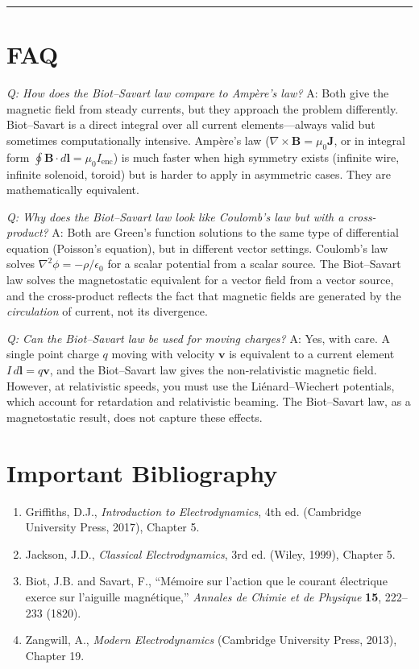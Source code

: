 \bigskip
\hrule
\bigskip
\section*{FAQ}

\textit{Q: How does the Biot--Savart law compare to Ampère's law?}
A: Both give the magnetic field from steady currents, but they approach the problem differently. Biot--Savart is a direct integral over all current elements---always valid but sometimes computationally intensive. Ampère's law ($\nabla\times\mathbf{B} = \mu_0\mathbf{J}$, or in integral form $\oint\mathbf{B}\cdot d\mathbf{l} = \mu_0 I_{\text{enc}}$) is much faster when high symmetry exists (infinite wire, infinite solenoid, toroid) but is harder to apply in asymmetric cases. They are mathematically equivalent.

\textit{Q: Why does the Biot--Savart law look like Coulomb's law but with a cross-product?}
A: Both are Green's function solutions to the same type of differential equation (Poisson's equation), but in different vector settings. Coulomb's law solves $\nabla^2\phi = -\rho/\epsilon_0$ for a scalar potential from a scalar source. The Biot--Savart law solves the magnetostatic equivalent for a vector field from a vector source, and the cross-product reflects the fact that magnetic fields are generated by the \emph{circulation} of current, not its divergence.

\textit{Q: Can the Biot--Savart law be used for moving charges?}
A: Yes, with care. A single point charge $q$ moving with velocity $\mathbf{v}$ is equivalent to a current element $I\,d\mathbf{l} = q\mathbf{v}$, and the Biot--Savart law gives the non-relativistic magnetic field. However, at relativistic speeds, you must use the Liénard--Wiechert potentials, which account for retardation and relativistic beaming. The Biot--Savart law, as a magnetostatic result, does not capture these effects.
\section*{Important Bibliography}
\begin{enumerate}
\item Griffiths, D.J., \textit{Introduction to Electrodynamics}, 4th ed. (Cambridge University Press, 2017), Chapter 5.
\item Jackson, J.D., \textit{Classical Electrodynamics}, 3rd ed. (Wiley, 1999), Chapter 5.
\item Biot, J.B. and Savart, F., ``Mémoire sur l'action que le courant électrique exerce sur l'aiguille magnétique,'' \textit{Annales de Chimie et de Physique} \textbf{15}, 222--233 (1820).
\item Zangwill, A., \textit{Modern Electrodynamics} (Cambridge University Press, 2013), Chapter 19.
\end{enumerate}

